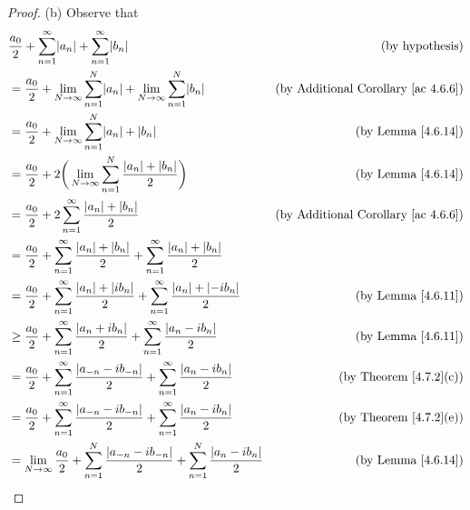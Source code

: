 \begin{proof}{(b)}
    Observe that
    \begin{align*}
         & \frac{a_0}{2} + \sum_{n = 1}^\infty \abs{a_n} + \sum_{n = 1}^\infty \abs{b_n}                                                             & \text{(by hypothesis)}                          \\
         & = \frac{a_0}{2} + \lim_{N \to \infty} \sum_{n = 1}^N \abs{a_n} + \lim_{N \to \infty} \sum_{n = 1}^N \abs{b_n}                             & \text{(by Additional Corollary \ref{ac 4.6.6})} \\
         & = \frac{a_0}{2} + \lim_{N \to \infty} \sum_{n = 1}^N \abs{a_n} + \abs{b_n}                                                                & \text{(by Lemma \ref{4.6.14})}                  \\
         & = \frac{a_0}{2} + 2 \bigg(\lim_{N \to \infty} \sum_{n = 1}^N \frac{\abs{a_n} + \abs{b_n}}{2}\bigg)                                        & \text{(by Lemma \ref{4.6.14})}                  \\
         & = \frac{a_0}{2} + 2 \sum_{n = 1}^\infty \frac{\abs{a_n} + \abs{b_n}}{2}                                                                   & \text{(by Additional Corollary \ref{ac 4.6.6})} \\
         & = \frac{a_0}{2} + \sum_{n = 1}^\infty \frac{\abs{a_n} + \abs{b_n}}{2} + \sum_{n = 1}^\infty \frac{\abs{a_n} + \abs{b_n}}{2}                                                                 \\
         & = \frac{a_0}{2} + \sum_{n = 1}^\infty \frac{\abs{a_n} + \abs{i b_n}}{2} + \sum_{n = 1}^\infty \frac{\abs{a_n} + \abs{-i b_n}}{2}          & \text{(by Lemma \ref{4.6.11})}                  \\
         & \geq \frac{a_0}{2} + \sum_{n = 1}^\infty \frac{\abs{a_n + i b_n}}{2} + \sum_{n = 1}^\infty \frac{\abs{a_n - i b_n}}{2}                    & \text{(by Lemma \ref{4.6.11})}                  \\
         & = \frac{a_0}{2} + \sum_{n = 1}^\infty \frac{\abs{a_{-n} - i b_{-n}}}{2} + \sum_{n = 1}^\infty \frac{\abs{a_n - i b_n}}{2}                 & \text{(by Theorem \ref{4.7.2}(c))}              \\
         & = \frac{a_0}{2} + \sum_{n = 1}^\infty \frac{\abs{a_{-n} - i b_{-n}}}{2} + \sum_{n = 1}^\infty \frac{\abs{a_n - i b_n}}{2}                 & \text{(by Theorem \ref{4.7.2}(e))}              \\
         & = \lim_{N \to \infty} \frac{a_0}{2} + \sum_{n = 1}^N \frac{\abs{a_{-n} - i b_{-n}}}{2} + \sum_{n = 1}^N \frac{\abs{a_n - i b_n}}{2}       & \text{(by Lemma \ref{4.6.14})}                  \\

\end{align*}
\end{proof}

